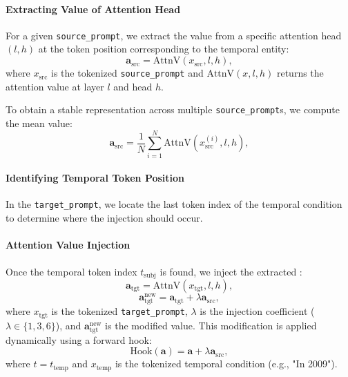 \paragraph{Extracting Value of Attention Head}
For a given \texttt{source\_prompt}, we extract the value from a specific attention head \((l,h)\) at the token position corresponding to the temporal entity:
\begin{equation}
    \mathbf{a}_{\mathrm{src}} = \text{AttnV}(x_{\text{src}}, l, h),
\end{equation}
where \( x_{\text{src}} \) is the tokenized \texttt{source\_prompt} and \( \text{AttnV}(x, l, h) \) returns the attention value at layer \( l \) and head \( h \).

To obtain a stable representation across multiple \texttt{source\_prompt}s, we compute the mean value:
\begin{equation}
    \mathbf{a}_{\mathrm{src}} = \frac{1}{N} \sum_{i=1}^{N} \text{AttnV}(x_{\text{src}}^{(i)}, l, h),
\end{equation}

\paragraph{Identifying Temporal Token Position}
In the \texttt{target\_prompt}, we locate the last token index of the temporal condition to determine where the  injection should occur.

\paragraph{Attention Value Injection}
Once the temporal token index \( t_{\text{subj}} \) is found, we inject the extracted :
\begin{equation}
    \mathbf{a}_{\mathrm{tgt}} = \text{AttnV}(x_{\text{tgt}}, l, h),
\end{equation}
\begin{equation}
    \mathbf{a}_{\mathrm{tgt}}^{\text{new}} = \mathbf{a}_{\mathrm{tgt}} + \lambda \mathbf{a}_{\mathrm{src}},
\end{equation}
where \( x_{\text{tgt}} \) is the tokenized \texttt{target\_prompt}, \( \lambda \) is the injection coefficient (\(\lambda \in \{1, 3, 6\}\)), and \( \mathbf{a}_{\mathrm{tgt}}^{\text{new}} \) is the modified value.
This modification is applied dynamically using a forward hook:
\begin{equation}
    \text{Hook}(\mathbf{a}) = \mathbf{a} + \lambda \mathbf{a}_{\mathrm{src}}, %
\end{equation}
where $t = t_{\text{temp}}$ and \( x_{\text{temp}} \) is the tokenized temporal condition (e.g., "In 2009").


